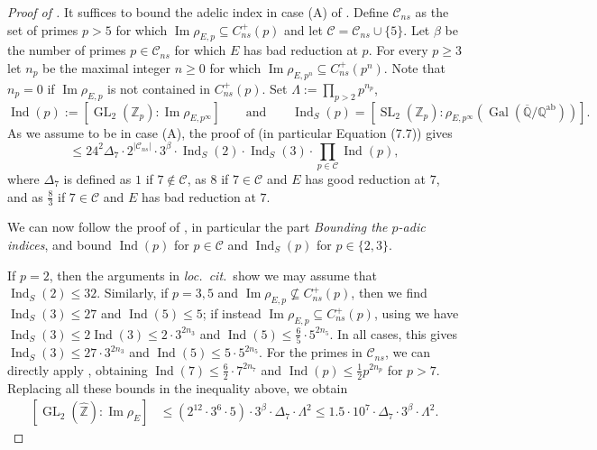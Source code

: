 \documentclass{amsart}
\newcommand{\op}[1]{\operatorname{#1}}
\theoremstyle{definition}
\newcommand{\Z}{\mathbb{Z}}
\newcommand{\Q}{\mathbb{Q}}
\newcommand{\Gal}{\operatorname{Gal}}
\newcommand{\GL}{\operatorname{GL}}
\newcommand{\SL}{\operatorname{SL}}
\numberwithin{theorem}{section}
\numberwithin{equation}{section}
\begin{document}
   
\begin{proof}[Proof of ]
    It suffices to bound the adelic index in case (A) of . Define $\mathcal{C}_{ns}$ as the set of primes $p>5$ for which $\operatorname{Im}\rho_{E,p} \subseteq C_{ns}^+(p)$ and let $\mathcal{C}=\mathcal{C}_{ns} \cup \{5\}$. Let $\beta$ be the number of primes $p \in \mathcal{C}_{ns}$ for which $E$ has bad reduction at $p$.
    For every $p \geq 3$ let $n_p$ be the maximal integer $n \geq 0$ for which $\operatorname{Im}\rho_{E,p^n} \subseteq C_{ns}^+(p^n)$. Note that $n_p=0$ if $\operatorname{Im} \rho_{E, p}$ is not contained in $C_{ns}^+(p)$.
    Set $\Lambda := \prod_{p>2} p^{n_p}$,
    \[
    \op{Ind}(p):=[\op{GL}_2(\Z_p):\op{Im} \rho_{E,p^{\infty}}] \qquad \text{and} \qquad \operatorname{Ind}_S(p) = [ \SL_2(\Z_p) : \rho_{E, p^\infty}(\Gal(\overline{\Q} / \Q^{\operatorname{ab}})) ].
    \]
    As we assume to be in case (A), the proof of \cite[Lemma 7.18]{furio24} (in particular Equation (7.7)) gives
    \begin{equation*}
        [\GL_2(\widehat{\Z}) : \operatorname{Im}\rho_E] \le 24^2 \Delta_7 \cdot 2^{|\mathcal{C}_{ns}|} \cdot 3^\beta \cdot \operatorname{Ind}_S(2) \cdot \operatorname{Ind}_S(3) \cdot \prod_{p \in \mathcal{C}} \op{Ind}(p),
    \end{equation*}
    where $\Delta_7$ is defined as $1$ if $7 \notin \mathcal{C}$, as $8$ if $7 \in \mathcal{C}$ and $E$ has good reduction at $7$, and as $\frac{8}{3}$ if $7 \in \mathcal{C}$ and $E$ has bad reduction at $7$.

    We can now follow the proof of \cite[Lemma 7.18]{furio24}, in particular the part \textit{Bounding the $p$-adic indices}, and bound $\op{Ind}(p)$ for $p \in \mathcal{C}$ and $\op{Ind}_S(p)$ for $p \in \{2,3\}$. 
    
    If $p=2$, then the arguments in \textit{loc.~cit.}~show we may assume that $\op{Ind}_S(2) \leq 32$. Similarly, if $p=3,5$ and $\op{Im} \rho_{E, p} \not \subseteq C_{ns}^+(p)$, then we find $\op{Ind}_S(3) \leq 27$ and $\op{Ind}(5) \leq 5$; if instead $\op{Im} \rho_{E, p} \subseteq C_{ns}^+(p)$, using  we have $\op{Ind}_S(3) \le 2 \op{Ind}(3) \le 2 \cdot 3^{2n_3}$ and $\op{Ind}(5) \le \frac{6}{5} \cdot 5^{2n_5}$. In all cases, this gives $\op{Ind}_S(3) \leq 27 \cdot 3^{2n_3}$ and $\op{Ind}(5) \leq 5 \cdot 5^{2n_5}$. For the primes in $\mathcal{C}_{ns}$, we can directly apply , obtaining $\op{Ind}(7) \leq \frac{6}{2} \cdot 7^{2n_7}$ and $\op{Ind}(p) \leq  \frac{1}{2}p^{2n_p}$ for $p > 7$. Replacing all these bounds in the inequality above, we obtain
	\begin{align}\label{eq: boundnonsuq}
		[\GL_2(\widehat{\Z}) : \operatorname{Im}\rho_E] &\leq (2^{12} \cdot 3^6 \cdot 5 ) \cdot 3^\beta \cdot \Delta_7 \cdot \Lambda^2 \leq 1.5 \cdot 10^7 \cdot \Delta_7 \cdot 3^{\beta} \cdot \Lambda^2.
	\end{align}
    

\end{proof}
\end{document}

